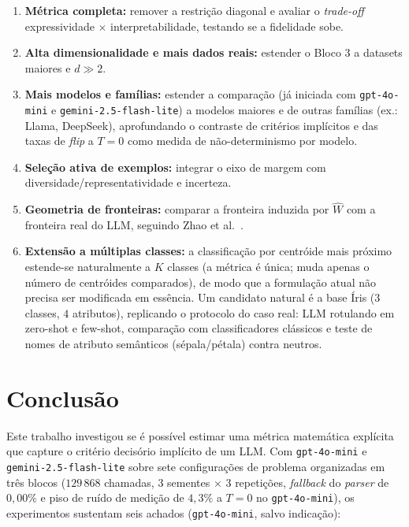 \documentclass[12pt,a4paper]{article}
\newcommand{\West}{\ensuremath{\hat{W}}}   %
\begin{document}
\begin{enumerate}
  \item \textbf{Métrica completa:} remover a restrição diagonal e avaliar o \emph{trade-off}
    expressividade $\times$ interpretabilidade, testando se a fidelidade sobe.
  \item \textbf{Alta dimensionalidade e mais dados reais:} estender o Bloco 3 a datasets
    maiores e $d \gg 2$.
  \item \textbf{Mais modelos e famílias:} estender a comparação (já iniciada com
    \texttt{gpt-4o-mini} e \texttt{gemini-2.5-flash-lite}) a modelos maiores e de outras
    famílias (ex.: Llama, DeepSeek), aprofundando o contraste de critérios implícitos e das
    taxas de \emph{flip} a $T=0$ como medida de não-determinismo por modelo.
  \item \textbf{Seleção ativa de exemplos:} integrar o eixo de margem
    \cite{minRethinkingRole2022} com diversidade/representatividade
    \cite{suSelectiveAnnotation2023} e incerteza.
  \item \textbf{Geometria de fronteiras:} comparar a fronteira induzida por \West{} com a
    fronteira real do LLM, seguindo Zhao et al.~\cite{zhaoProbing2024}.
  \item \textbf{Extensão a múltiplas classes:} a classificação por centróide mais próximo
    estende-se naturalmente a $K$ classes (a métrica é única; muda apenas o número de
    centróides comparados), de modo que a formulação atual não precisa ser modificada em
    essência. Um candidato natural é a base Íris ($3$ classes, $4$ atributos), replicando
    o protocolo do caso real: LLM rotulando em zero-shot e few-shot, comparação com
    classificadores clássicos e teste de nomes de atributo semânticos (sépala/pétala)
    contra neutros.
\end{enumerate}

\section{Conclusão}
\label{sec:conclusao}

Este trabalho investigou se é possível estimar uma métrica matemática explícita que capture
o critério decisório implícito de um LLM. Com \texttt{gpt-4o-mini} e
\texttt{gemini-2.5-flash-lite} sobre sete configurações de problema organizadas em três
blocos ($129\,868$ chamadas, $3$ sementes $\times$ $3$ repetições, \emph{fallback} do
\emph{parser} de $0{,}00\%$ e piso de ruído de medição de $4{,}3\%$ a $T=0$ no
\texttt{gpt-4o-mini}), os experimentos sustentam seis achados (\texttt{gpt-4o-mini}, salvo
indicação):
\end{document}

